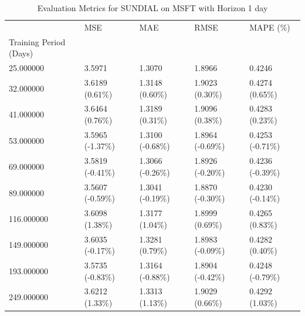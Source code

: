 \begin{table}
\caption{Evaluation Metrics for SUNDIAL on MSFT with Horizon 1 day}
\label{tab:sundial_MSFT_h1_metrics}
\begin{tabular}{lllll}
\toprule
 & MSE & MAE & RMSE & MAPE (\%) \\
Training Period (Days) &  &  &  &  \\
\midrule
25.000000 & 3.5971 & 1.3070 & 1.8966 & 0.4246 \\
32.000000 & 3.6189 (0.61\%) & 1.3148 (0.60\%) & 1.9023 (0.30\%) & 0.4274 (0.65\%) \\
41.000000 & 3.6464 (0.76\%) & 1.3189 (0.31\%) & 1.9096 (0.38\%) & 0.4283 (0.23\%) \\
53.000000 & 3.5965 (-1.37\%) & 1.3100 (-0.68\%) & 1.8964 (-0.69\%) & 0.4253 (-0.71\%) \\
69.000000 & 3.5819 (-0.41\%) & 1.3066 (-0.26\%) & 1.8926 (-0.20\%) & 0.4236 (-0.39\%) \\
89.000000 & 3.5607 (-0.59\%) & 1.3041 (-0.19\%) & 1.8870 (-0.30\%) & 0.4230 (-0.14\%) \\
116.000000 & 3.6098 (1.38\%) & 1.3177 (1.04\%) & 1.8999 (0.69\%) & 0.4265 (0.83\%) \\
149.000000 & 3.6035 (-0.17\%) & 1.3281 (0.79\%) & 1.8983 (-0.09\%) & 0.4282 (0.40\%) \\
193.000000 & 3.5735 (-0.83\%) & 1.3164 (-0.88\%) & 1.8904 (-0.42\%) & 0.4248 (-0.79\%) \\
249.000000 & 3.6212 (1.33\%) & 1.3313 (1.13\%) & 1.9029 (0.66\%) & 0.4292 (1.03\%) \\
\bottomrule
\end{tabular}
\end{table}
